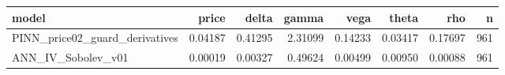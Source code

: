 \begin{tabular}{lrrrrrrr}
\toprule
model & price & delta & gamma & vega & theta & rho & n \\
\midrule
PINN_price02_guard_derivatives & 0.04187 & 0.41295 & 2.31099 & 0.14233 & 0.03417 & 0.17697 & 961 \\
ANN_IV_Sobolev_v01 & 0.00019 & 0.00327 & 0.49624 & 0.00499 & 0.00950 & 0.00088 & 961 \\
\bottomrule
\end{tabular}
